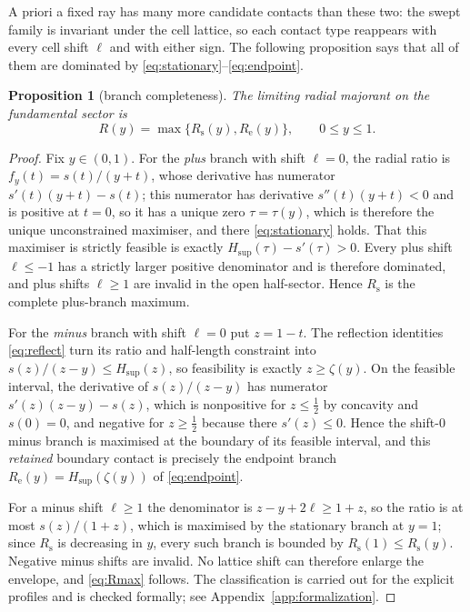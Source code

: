 \documentclass[11pt]{article}
\theoremstyle{plain}
\newtheorem{proposition}[theorem]{Proposition}
\theoremstyle{definition}
\theoremstyle{remark}
\newcommand{\Rsta}{R_{\mathrm{s}}}
\newcommand{\Rend}{R_{\mathrm{e}}}
\newcommand{\Hsup}{H_{\mathrm{sup}}}
\begin{document}
A priori a fixed ray has many more candidate contacts than these two: the swept
family is invariant under the cell lattice, so each contact type reappears with
every cell shift $\ell$ and with either sign. The following proposition says
that all of them are dominated by
\eqref{eq:stationary}--\eqref{eq:endpoint}.

\begin{proposition}[branch completeness]\label{prop:branches}
The limiting radial majorant on the fundamental sector is
\begin{equation}\label{eq:Rmax}
  R(y)=\max\{\Rsta(y),\Rend(y)\},\qquad 0\le y\le1 .
\end{equation}
\end{proposition}

\begin{proof}
Fix $y\in(0,1)$. For the \emph{plus} branch with shift $\ell=0$, the radial
ratio is $f_{y}(t)=s(t)/(y+t)$, whose derivative has numerator
$s'(t)(y+t)-s(t)$; this numerator has derivative $s''(t)(y+t)<0$ and is positive
at $t=0$, so it has a unique zero $\tau=\tau(y)$, which is therefore the unique
unconstrained maximiser, and there \eqref{eq:stationary} holds. That this
maximiser is strictly feasible is exactly $\Hsup(\tau)-s'(\tau)>0$. Every plus
shift $\ell\le-1$ has a strictly larger positive denominator and is therefore
dominated, and plus shifts $\ell\ge1$ are invalid in the open half-sector.
Hence $\Rsta$ is the complete plus-branch maximum.

For the \emph{minus} branch with shift $\ell=0$ put $z=1-t$. The reflection
identities \eqref{eq:reflect} turn its ratio and half-length constraint into
$s(z)/(z-y)\le\Hsup(z)$, so feasibility is exactly $z\ge\zeta(y)$. On the
feasible interval, the derivative of $s(z)/(z-y)$ has numerator
$s'(z)(z-y)-s(z)$, which is nonpositive for $z\le\tfrac12$ by concavity and
$s(0)=0$, and negative for $z\ge\tfrac12$ because there $s'(z)\le0$. Hence the
shift-$0$ minus branch is maximised at the boundary of its feasible interval,
and this \emph{retained} boundary contact is precisely the endpoint branch
$\Rend(y)=\Hsup(\zeta(y))$ of \eqref{eq:endpoint}.

For a minus shift $\ell\ge1$ the denominator is $z-y+2\ell\ge1+z$, so the ratio
is at most $s(z)/(1+z)$, which is maximised by the stationary branch at $y=1$;
since $\Rsta$ is decreasing in $y$, every such branch is bounded by
$\Rsta(1)\le\Rsta(y)$. Negative minus shifts are invalid. No lattice shift can
therefore enlarge the envelope, and \eqref{eq:Rmax} follows. The classification
is carried out for the explicit profiles and is checked formally; see
Appendix~\ref{app:formalization}.
\end{proof}
\end{document}
